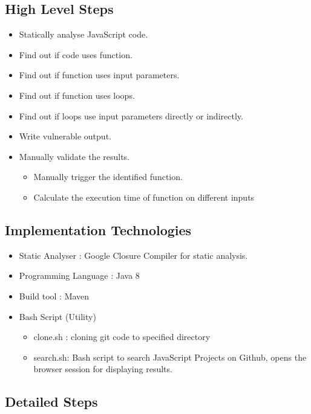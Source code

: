 \documentclass[authoryear,preprint]{sigplanconf}
\begin{document}
\subsection{High Level Steps}
\begin{itemize}
	\item Statically analyse JavaScript code.
	\item Find out if code uses function.
	\item Find out if function uses input parameters.
	\item Find out if function uses loops.
	\item Find out if loops use input parameters directly or indirectly.
	\item Write vulnerable output.
	\item Manually validate the results.
			\begin{itemize}
				\item Manually trigger the identified function.
				\item Calculate the execution time of function on different inputs
			\end{itemize}
\end{itemize}

\subsection{Implementation Technologies}
\begin{itemize}
	\item Static Analyser : Google Closure Compiler for static analysis.
	\item Programming Language : Java 8
	\item Build tool : Maven
	\item Bash Script (Utility)
			\begin{itemize}
				\item clone.sh : cloning git code to specified directory
				\item search.sh: Bash script to search JavaScript Projects on Github, opens the browser session for displaying results.\end{itemize}
\end{itemize}


\subsection{Detailed Steps}
\end{document}
